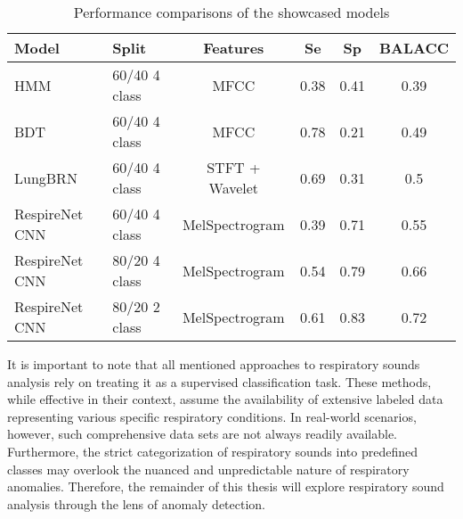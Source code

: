 \begin{table}[h!]
    \centering
    \caption{
        Performance comparisons of the showcased models 
    }
    \begin{tabularx}{\linewidth}{lXcccc}
    \toprule
    \textbf{Model}        & \textbf{Split} & \textbf{Features} & \textbf{Se} & \textbf{Sp} & \textbf{BALACC} \\
    \midrule
    HMM                   & 60/40 4 class          & MFCC              & 0.38                & 0.41                 & 0.39 \\
    BDT                   & 60/40 4 class          & MFCC              & 0.78                & 0.21                 & 0.49 \\
    LungBRN               & 60/40 4 class          & STFT + Wavelet    & 0.69                & 0.31                 & 0.5  \\
    RespireNet CNN        & 60/40 4 class          & MelSpectrogram    & 0.39                & 0.71                 & 0.55 \\
    RespireNet CNN        & 80/20 4 class  & MelSpectrogram    & 0.54                & 0.79                 & 0.66 \\
    RespireNet CNN        & 80/20 2 class  & MelSpectrogram    & 0.61                & 0.83                 & 0.72 \\
    \bottomrule
    \end{tabularx}
\end{table}

    
It is important to note that all mentioned approaches to respiratory sounds analysis rely on treating it as a supervised classification task. These methods, while effective in their context, assume the availability of extensive labeled data representing various specific respiratory conditions. In real-world scenarios, however, such comprehensive data sets are not always readily available. Furthermore, the strict categorization of respiratory sounds into predefined classes may overlook the nuanced and unpredictable nature of respiratory anomalies. Therefore, the remainder of this thesis will explore respiratory sound analysis through the lens of anomaly detection.

